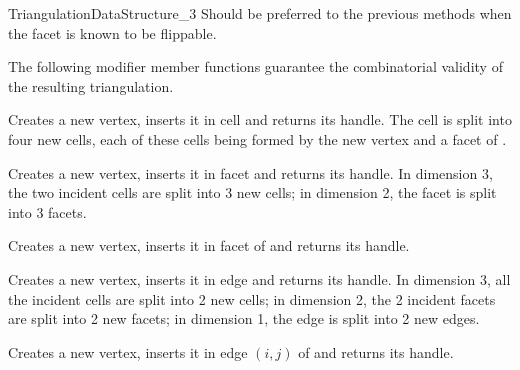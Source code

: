 \begin{ccRefConcept}{TriangulationDataStructure_3}
\ccGlue
{}
{Should be preferred to the previous methods when the facet is
known to be flippable.
}


The following modifier member functions guarantee
the combinatorial validity of the resulting triangulation.

{Creates a new vertex, inserts it in cell  and returns its handle.
The cell  is split into four new cells, each of these cells being
formed by the new vertex and a facet of .
}

{Creates a new vertex, inserts it in facet  and returns its handle.
In dimension 3, the two incident cells are split into 3 new cells;
in dimension 2, the facet is split into 3 facets.
} 

{Creates a new vertex, inserts it in facet  of  and returns its
handle.
} 

{Creates a new vertex, inserts it in edge  and returns its handle.
In dimension 3, all the
incident cells are split into 2 new cells; in dimension 2, the 2
incident facets are split into 2 new facets; in dimension 1, the edge is 
split into 2 new edges.
} 

{Creates a new vertex, inserts it in edge $(i,j)$ of  and returns its
handle.
}


\end{ccRefConcept}
